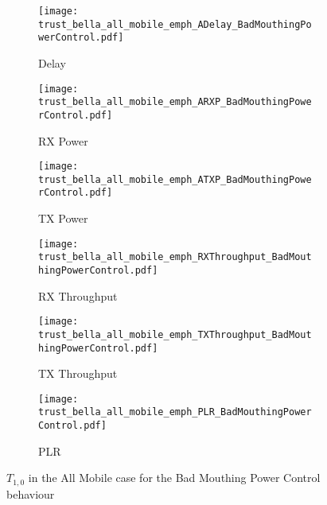 \documentclass[runningheads,a4paper]{llncs}
\begin{document}
\begin{figure}
\begin{subfigure}{0.32\textwidth}
  \centering
  \texttt{[image: trust\_bella\_all\_mobile\_emph\_ADelay\_BadMouthingPowerControl.pdf]}
  \caption{Delay}
  \label{fig:all_mobile_badmouthing_delay}
\end{subfigure}
\begin{subfigure}{0.32\textwidth}
\centering
  \texttt{[image: trust\_bella\_all\_mobile\_emph\_ARXP\_BadMouthingPowerControl.pdf]}
  \caption{RX Power}
  \label{fig:all_mobile_badmouthing_rxp}
\end{subfigure}
\begin{subfigure}{0.32\textwidth}
\centering
  \texttt{[image: trust\_bella\_all\_mobile\_emph\_ATXP\_BadMouthingPowerControl.pdf]}
  \caption{TX Power}
  \label{fig:all_mobile_badmouthing_txp}
\end{subfigure}
\begin{subfigure}{0.32\textwidth}
\centering
  \texttt{[image: trust\_bella\_all\_mobile\_emph\_RXThroughput\_BadMouthingPowerControl.pdf]}
  \caption{RX Throughput}
  \label{fig:all_mobile_badmouthing_rxthroughput}
\end{subfigure}
\begin{subfigure}{0.32\textwidth}
\centering
  \texttt{[image: trust\_bella\_all\_mobile\_emph\_TXThroughput\_BadMouthingPowerControl.pdf]}
  \caption{TX Throughput}
  \label{fig:all_mobile_badmouthing_txthroughput}
\end{subfigure}
\begin{subfigure}{0.32\textwidth}
\centering
  \texttt{[image: trust\_bella\_all\_mobile\_emph\_PLR\_BadMouthingPowerControl.pdf]}
  \caption{PLR}
  \label{fig:all_mobile_badmouthing_plr}
\end{subfigure}
\caption{$T_{1,0}$ in the All Mobile case for the Bad Mouthing Power Control behaviour}
\label{fig:all_mobile_badmouthing}
\end{figure}
\end{document}
